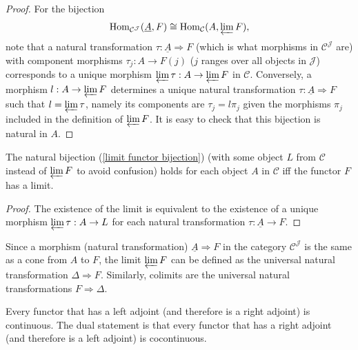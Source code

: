 \begin{proof}
    For the bijection 
    \[
        \operatorname{Hom}_{\mathcal{C}^\mathcal{J}}(\underline{A},F)\cong \operatorname{Hom}_{\mathcal{C}}(A,\varprojlim F),\label{limit functor bijection}
    \]
    note that a natural transformation $\tau: \underline{A}\Longrightarrow F$ (which is what morphisms in $\mathcal{C}^\mathcal{J}$ are) with component morphisms $\tau_j:A\to F(j)$ ($j$ ranges over all objects in $\mathcal{J}$) corresponds to a unique morphism $\varprojlim \tau: A\to \varprojlim F$ in $\mathcal{C}$. Conversely, a morphism $l:A\to \varprojlim F$ determines a unique natural transformation $\tau:\underline{A}\Longrightarrow F$ such that $l=\varprojlim \tau$, namely its components are $\tau_j=l\pi_j$ given the morphisms $\pi_j$ included in the definition of $\varprojlim F$. It is easy to check that this bijection is natural in $A$.
\end{proof}
\begin{cor}\label{corollary on limits}
    The natural bijection (\ref{limit functor bijection}) (with some object $L$ from $\mathcal{C}$ instead of $\varprojlim F$ to avoid confusion) holds for each object $A$ in $\mathcal{C}$ iff the functor $F$ has a limit.
\end{cor}
\begin{proof}
    The existence of the limit is equivalent to the existence of a unique morphism $\varprojlim \tau: A\to L$ for each natural transformation $\tau:\underline{A}\to F$.
\end{proof}
\begin{rem}
    Since a morphism (natural transformation) $\underline{A}\Longrightarrow F$ in the category $\mathcal{C}^\mathcal{J}$ is the same as a cone from $A$ to $F$, the limit $\varprojlim F$ can be defined as the universal natural transformation $\Delta \Longrightarrow F$. Similarly, colimits are the universal natural transformations $F\Longrightarrow \Delta$.
\end{rem}
\begin{thm}\label{continuity of adjoints thm}
    Every functor that has a left adjoint (and therefore is a right adjoint) is continuous. The dual statement is that every functor that has a right adjoint (and therefore is a left adjoint) is cocontinuous.
\end{thm}
